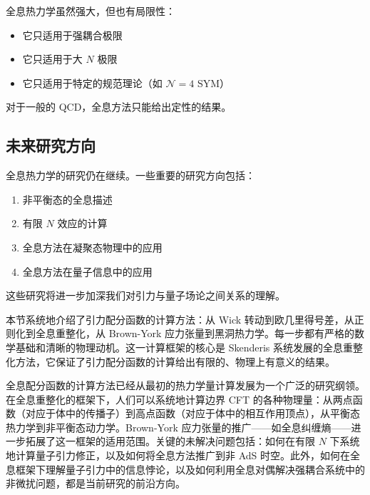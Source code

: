 \begin{remark}[全息热力学的局限性]
全息热力学虽然强大，但也有局限性：
\begin{itemize}
    \item 它只适用于强耦合极限
    \item 它只适用于大 $N$ 极限
    \item 它只适用于特定的规范理论（如 $\mathcal{N}=4$ SYM）
\end{itemize}
对于一般的 QCD，全息方法只能给出定性的结果。
\end{remark}

\subsection{未来研究方向}

全息热力学的研究仍在继续。一些重要的研究方向包括：
\begin{enumerate}
    \item 非平衡态的全息描述
    \item 有限 $N$ 效应的计算
    \item 全息方法在凝聚态物理中的应用
    \item 全息方法在量子信息中的应用
\end{enumerate}

这些研究将进一步加深我们对引力与量子场论之间关系的理解。

\begin{remark}[全息配分函数计算的总结]
本节系统地介绍了引力配分函数的计算方法：从 Wick 转动到欧几里得号差，从正则化到全息重整化，从 Brown-York 应力张量到黑洞热力学。每一步都有严格的数学基础和清晰的物理动机。这一计算框架的核心是 Skenderis\cite{Skenderis2002} 系统发展的全息重整化方法，它保证了引力配分函数的计算给出有限的、物理上有意义的结果。
\end{remark}

\begin{note}[全息方法的未来展望]
全息配分函数的计算方法已经从最初的热力学量计算发展为一个广泛的研究纲领。在全息重整化\cite{Skenderis2002}的框架下，人们可以系统地计算边界 CFT 的各种物理量：从两点函数（对应于体中的传播子）到高点函数（对应于体中的相互作用顶点），从平衡态热力学到非平衡态动力学。Brown-York 应力张量\cite{Balasubramanian1999,Brown1993}的推广——如全息纠缠熵——进一步拓展了这一框架的适用范围。关键的未解决问题包括：如何在有限 $N$ 下系统地计算量子引力修正，以及如何将全息方法推广到非 AdS 时空。此外，如何在全息框架下理解量子引力中的信息悖论，以及如何利用全息对偶解决强耦合系统中的非微扰问题，都是当前研究的前沿方向\cite{Aharony1999}。
\end{note}

